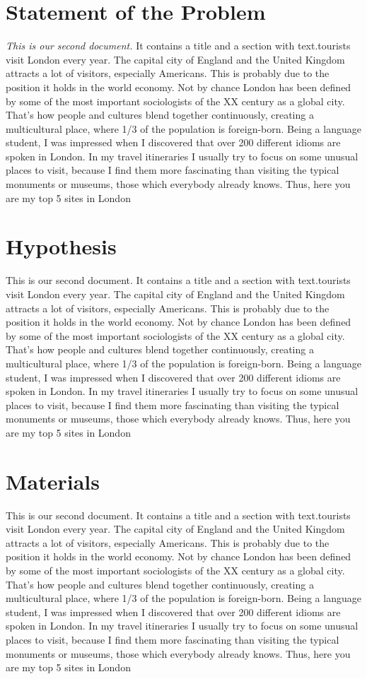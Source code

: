\documentclass[a4paper,11pt]{ctexart}
\begin{document}
\section{Statement of the Problem}
\textit{This is our second document.}\cite{RN853} It contains a title and a 
section with text.tourists visit London every year\cite{RN869}. The capital city of England and the United Kingdom attracts a lot of visitors, especially Americans. This is probably due to the position it holds in the world economy.
Not by chance London has been defined by some of the most important sociologists of the XX century as a global city. That’s how people and cultures blend together continuously, creating a multicultural place, where 1/3 of the population is foreign-born. Being a language student, I was impressed when I discovered that over 200 different idioms are spoken in London.
In my travel itineraries I usually try to focus on some unusual places to visit, because I find them more fascinating than visiting the typical monuments or museums, those which everybody already knows. Thus, here you are my top 5 sites in London

\section{Hypothesis}
This is our second document. It contains a title and a 
section with text.tourists visit London every year. The capital city of England and the United Kingdom attracts a lot of visitors, especially Americans. This is probably due to the position it holds in the world economy.
Not by chance London has been defined by some of the most important sociologists of the XX century as a global city. That’s how people and cultures blend together continuously, creating a multicultural place, where 1/3 of the population is foreign-born. Being a language student, I was impressed when I discovered that over 200 different idioms are spoken in London.
In my travel itineraries I usually try to focus on some unusual places to visit, because I find them more fascinating than visiting the typical monuments or museums, those which everybody already knows. Thus, here you are my top 5 sites in London

\section{Materials}
This is our second document. It contains a title and a 
section with text.tourists visit London every year. The capital city of England and the United Kingdom attracts a lot of visitors, especially Americans. This is probably due to the position it holds in the world economy.
Not by chance London has been defined by some of the most important sociologists of the XX century as a global city. That’s how people and cultures blend together continuously, creating a multicultural place, where 1/3 of the population is foreign-born. Being a language student, I was impressed when I discovered that over 200 different idioms are spoken in London.
In my travel itineraries I usually try to focus on some unusual places to visit, because I find them more fascinating than visiting the typical monuments or museums, those which everybody already knows. Thus, here you are my top 5 sites in London
\end{document}
